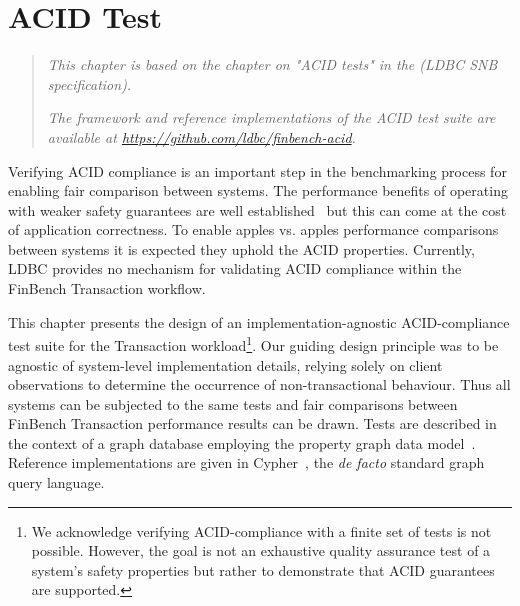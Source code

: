 \chapter{ACID Test}
\label{sec:acid-test}

\newcommand{\bl}[1]{\textcolor{blue}{#1}}
\newcommand{\rd}[1]{\textcolor{red}{#1}}
\newcommand{\gn}[1]{\textcolor{green}{#1}}
\newcommand{\gy}[1]{\textcolor{grey}{\textit{#1}}}

\newcommand{\level}[1]{\textsf{#1}}
\newcommand{\anomaly}[1]{\rd{#1}}
\newcommand{\anolong}[1]{\emph{\rd{#1}}}
\newcommand{\tx}[1]{#1}

\newcommand{\cmark}{\ding{51}}
\newcommand{\xmark}{\ding{55}}


\begin{quote}
  \textit{This chapter is based on the chapter on "ACID tests" in the 
          \ldbcsnb(LDBC SNB specification).
  }

  \textit{The framework and reference implementations of the ACID test suite are
          available at \url{https://github.com/ldbc/finbench-acid}.
  }
\end{quote}

Verifying ACID compliance is an important step in the benchmarking process for 
enabling fair comparison between systems. The performance benefits of operating
with weaker safety guarantees are well established~\cite{DBLP:conf/ds/GrayLPT76}
but this can come at the cost of application correctness. To enable apples vs. 
apples performance comparisons between systems it is expected they uphold the 
ACID properties. Currently, LDBC provides no mechanism for validating ACID 
compliance within the FinBench Transaction workflow.

This chapter presents the design of an implementation-agnostic ACID-compliance
test suite for the Transaction workload\footnote{We acknowledge verifying 
ACID-compliance with a finite set of tests is not possible. However, the goal is
not an exhaustive quality assurance test of a system's safety properties but 
rather to demonstrate that ACID guarantees are supported.}. Our guiding design
principle was to be agnostic of system-level implementation details, relying 
solely on client observations to determine the occurrence of non-transactional 
behaviour. Thus all systems can be subjected to the same tests and fair 
comparisons between FinBench Transaction performance results can be drawn. Tests
are described in the context of a graph database employing the property graph data 
model~\cite{DBLP:journals/csur/AnglesABHRV17}. Reference implementations are 
given in Cypher~\cite{DBLP:conf/sigmod/FrancisGGLLMPRS18}, the \emph{de facto} 
standard graph query language.

